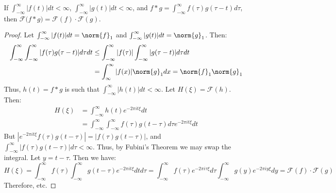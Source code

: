 \documentclass[crop=false,class=book,oneside]{standalone}
\begin{document}
            \begin{theorem}
            If $\int_{-\infty}^{\infty} |f(t)|dt < \infty$, $\int_{-\infty}^{\infty} |g(t)|dt < \infty$, and $f* g = \int_{-\infty}^{\infty} f(\tau)g(\tau-t)d\tau$, then $\mathcal{F}\big(f * g\big) = \mathcal{F}(f)\cdot \mathcal{F}(g)$.
            \end{theorem}
            \begin{proof}
            Let $\int_{-\infty}^{\infty} |f(t)|dt = \norm{f}_{1}$ and $\int_{-\infty}^{\infty} |g(t)|dt = \norm{g}_{1}$. Then:
            \begin{align*}
            \int_{-\infty}^{\infty}\int_{-\infty}^{\infty}|f(\tau)g(\tau-t)|d\tau dt&\leq\int_{-\infty}^{\infty}|f(\tau)|\int_{-\infty}^{\infty}|g(\tau-t)|d\tau dt\\
            &=\int_{\infty}^{\infty}|f(x)|\norm{g}_{1}dx=\norm{f}_{1}\norm{g}_{1}    
            \end{align*}
            Thus, $h(t) = f* g$ is such that $\int_{-\infty}^{\infty} |h(t)|dt < \infty$. Let $H(\xi) = \mathcal{F}(h)$. Then:
            \begin{align*}
            H(\xi)&=\int_{-\infty}^{\infty}h(t)e^{-2\pi it\xi}dt\\
            &=\int_{-\infty}^{\infty}\int_{-\infty}^{\infty}f(\tau)g(t-\tau)d\tau e^{-2\pi i t\xi}dt
            \end{align*}
            But $|e^{-2\pi i t \xi}f(\tau)g(t-\tau)| = |f(\tau)g(t-\tau)|$, and $\int_{-\infty}^{\infty}|f(\tau)g(t-\tau)|d\tau < \infty$. Thus, by Fubini's Theorem we may swap the integral. Let $y = t-\tau$. Then we have:
            \begin{equation*}
            H(\xi)=\int_{-\infty}^{\infty}f(\tau)\int_{-\infty}^{\infty}g(t-\tau)e^{-2\pi it\xi}dtd\tau=\int_{-\infty}^{\infty}f(\tau)e^{-2\pi i\tau\xi}d\tau\int_{-\infty}^{\infty}g(y)e^{-2\pi iy\xi}dy=\mathcal{F}(f)\cdot\mathcal{F}(g)    
            \end{equation*}
            Therefore, etc.
            \end{proof}
            
\end{document}
